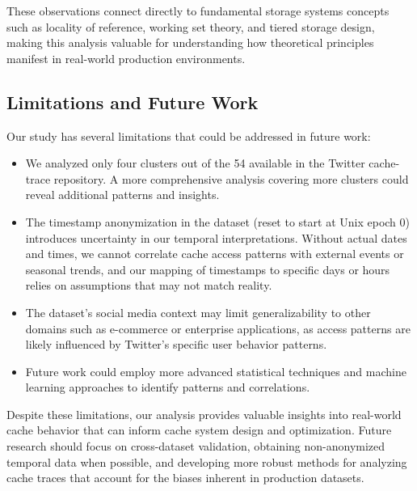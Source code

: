 \documentclass[conference]{IEEEtran}
\begin{document}
These observations connect directly to fundamental storage systems concepts such as locality of reference, working set theory, and tiered storage design, making this analysis valuable for understanding how theoretical principles manifest in real-world production environments.

\subsection{Limitations and Future Work}
Our study has several limitations that could be addressed in future work:
\begin{itemize}
    \item We analyzed only four clusters out of the 54 available in the Twitter cache-trace repository. A more comprehensive analysis covering more clusters could reveal additional patterns and insights.
    
    \item The timestamp anonymization in the dataset (reset to start at Unix epoch 0) introduces uncertainty in our temporal interpretations. Without actual dates and times, we cannot correlate cache access patterns with external events or seasonal trends, and our mapping of timestamps to specific days or hours relies on assumptions that may not match reality.
    
    \item The dataset's social media context may limit generalizability to other domains such as e-commerce or enterprise applications, as access patterns are likely influenced by Twitter's specific user behavior patterns.
    
    \item Future work could employ more advanced statistical techniques and machine learning approaches to identify patterns and correlations.
\end{itemize}

Despite these limitations, our analysis provides valuable insights into real-world cache behavior that can inform cache system design and optimization. Future research should focus on cross-dataset validation, obtaining non-anonymized temporal data when possible, and developing more robust methods for analyzing cache traces that account for the biases inherent in production datasets.
\end{document}
